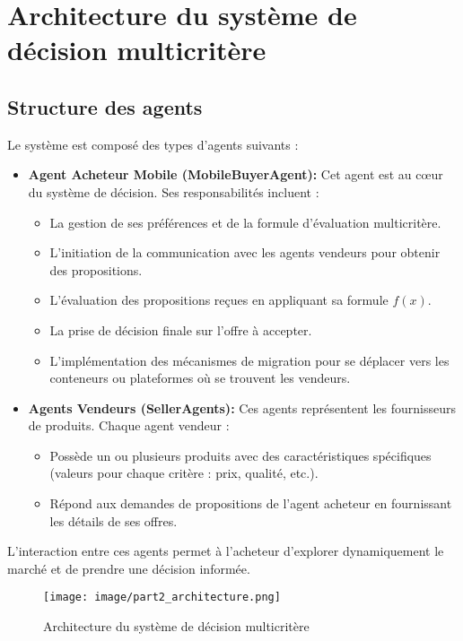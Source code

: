 \documentclass[a4paper,12pt]{report}
\begin{document}
\section{Architecture du système de décision multicritère}
\subsection{Structure des agents}
Le système est composé des types d'agents suivants :
\begin{itemize}
    \item \textbf{Agent Acheteur Mobile (MobileBuyerAgent):} Cet agent est au cœur du système de décision. Ses responsabilités incluent :
        \begin{itemize}
            \item La gestion de ses préférences et de la formule d'évaluation multicritère.
            \item L'initiation de la communication avec les agents vendeurs pour obtenir des propositions.
            \item L'évaluation des propositions reçues en appliquant sa formule \(f(x)\).
            \item La prise de décision finale sur l'offre à accepter.
            \item L'implémentation des mécanismes de migration pour se déplacer vers les conteneurs ou plateformes où se trouvent les vendeurs.
        \end{itemize}
    \item \textbf{Agents Vendeurs (SellerAgents):} Ces agents représentent les fournisseurs de produits. Chaque agent vendeur :
        \begin{itemize}
            \item Possède un ou plusieurs produits avec des caractéristiques spécifiques (valeurs pour chaque critère : prix, qualité, etc.).
            \item Répond aux demandes de propositions de l'agent acheteur en fournissant les détails de ses offres.
        \end{itemize}
\end{itemize}
L'interaction entre ces agents permet à l'acheteur d'explorer dynamiquement le marché et de prendre une décision informée.
\begin{figure}[H]
    \centering
    \texttt{[image: image/part2\_architecture.png]}
    \caption{Architecture du système de décision multicritère}
\end{figure}
\end{document}
